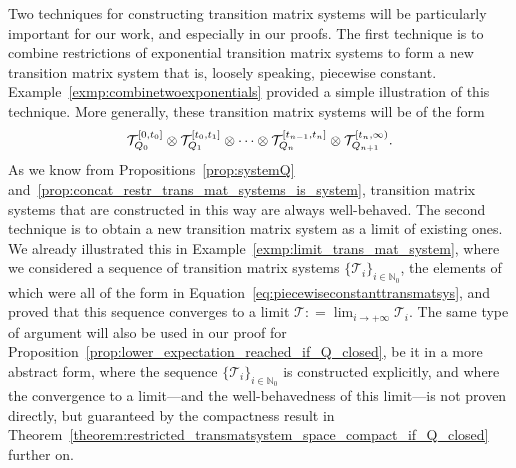 \documentclass[10pt,a4paper]{paper}
\theoremstyle{definition}
\newcommand{\nats}{\mathbb{N}}
\newcommand{\coloneqq}{:\!=}
\begin{document}
Two techniques for constructing transition matrix systems will be particularly important for our work, and especially in our proofs. The first technique is to combine restrictions of exponential transition matrix systems to form a new transition matrix system that is, loosely speaking, piecewise constant. Example~\ref{exmp:combinetwoexponentials} provided a simple illustration of this technique. More generally, these transition matrix systems will be of the form
\begin{equation}\label{eq:piecewiseconstanttransmatsys}
\mathcal{T}_{Q_0}^{[0,t_0]}\otimes \mathcal{T}_{Q_1}^{[t_0,t_1]} \otimes \cdots \otimes \mathcal{T}_{Q_n}^{[t_{n-1},t_n]} \otimes \mathcal{T}_{Q_{n+1}}^{[t_n,\infty)}.
\vspace{4pt}
\end{equation}
As we know from Propositions~\ref{prop:systemQ} and~\ref{prop:concat_restr_trans_mat_systems_is_system}, transition matrix systems that are constructed in this way are always well-behaved. 
The second technique is to obtain a new transition matrix system as a limit of existing ones. We already illustrated this in Example~\ref{exmp:limit_trans_mat_system}, where we considered a sequence of transition matrix systems $\{\mathcal{T}_i\}_{i\in\nats_0}$, the elements of which were all of the form in Equation~\eqref{eq:piecewiseconstanttransmatsys}, and proved that this sequence converges to a limit $\mathcal{T}\coloneqq\lim_{i\to+\infty}\mathcal{T}_i$. The same type of argument will also be used in our proof for Proposition~\ref{prop:lower_expectation_reached_if_Q_closed}, be it in a more abstract form, where the sequence $\{\mathcal{T}_i\}_{i\in\nats_0}$ is constructed explicitly, and where the convergence to a limit---and the well-behavedness of this limit---is not proven directly, but guaranteed by the compactness result in Theorem~\ref{theorem:restricted_transmatsystem_space_compact_if_Q_closed} further on.








\end{document}

